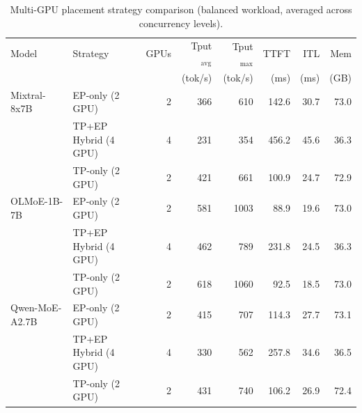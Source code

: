 \begin{table}[t]
\centering
\caption{Multi-GPU placement strategy comparison (balanced workload, averaged across concurrency levels).}
\label{tab:strategy-comparison}
\small
\begin{tabular}{llrrrrrr}
\toprule
Model & Strategy & GPUs & Tput$_{\text{avg}}$ & Tput$_{\text{max}}$ & TTFT & ITL & Mem \\
 & & & (tok/s) & (tok/s) & (ms) & (ms) & (GB) \\
\midrule
  Mixtral-8x7B & EP-only (2 GPU) & 2 & 366 & 610 & 142.6 & 30.7 & 73.0 \\
   & TP+EP Hybrid (4 GPU) & 4 & 231 & 354 & 456.2 & 45.6 & 36.3 \\
   & TP-only (2 GPU) & 2 & 421 & 661 & 100.9 & 24.7 & 72.9 \\
\midrule
  OLMoE-1B-7B & EP-only (2 GPU) & 2 & 581 & 1003 & 88.9 & 19.6 & 73.0 \\
   & TP+EP Hybrid (4 GPU) & 4 & 462 & 789 & 231.8 & 24.5 & 36.3 \\
   & TP-only (2 GPU) & 2 & 618 & 1060 & 92.5 & 18.5 & 73.0 \\
\midrule
  Qwen-MoE-A2.7B & EP-only (2 GPU) & 2 & 415 & 707 & 114.3 & 27.7 & 73.1 \\
   & TP+EP Hybrid (4 GPU) & 4 & 330 & 562 & 257.8 & 34.6 & 36.5 \\
   & TP-only (2 GPU) & 2 & 431 & 740 & 106.2 & 26.9 & 72.4 \\
\bottomrule
\end{tabular}
\end{table}